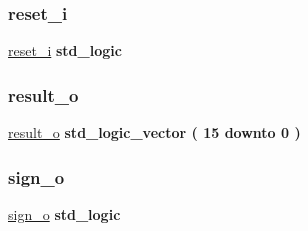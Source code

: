 \mbox{\label{classtb__alu_1_1sim_acdf401306b90eed21a930a1cdc85e912}} 
\subsubsection{\texorpdfstring{reset\+\_\+i}{reset\_i}}
{\footnotesize\ttfamily \hyperlink{classtb__alu_1_1sim_acdf401306b90eed21a930a1cdc85e912}{reset\+\_\+i} {\bfseries \textcolor{comment}{std\+\_\+logic}\textcolor{vhdlchar}{ }} \hspace{0.3cm}{\ttfamily [Signal]}}

\mbox{\label{classtb__alu_1_1sim_a9dbda0fe1ce0149ac85e0c8e3bc9d201}} 
\subsubsection{\texorpdfstring{result\+\_\+o}{result\_o}}
{\footnotesize\ttfamily \hyperlink{classtb__alu_1_1sim_a9dbda0fe1ce0149ac85e0c8e3bc9d201}{result\+\_\+o} {\bfseries \textcolor{comment}{std\+\_\+logic\+\_\+vector}\textcolor{vhdlchar}{ }\textcolor{vhdlchar}{(}\textcolor{vhdlchar}{ }\textcolor{vhdlchar}{ } \textcolor{vhdldigit}{15} \textcolor{vhdlchar}{ }\textcolor{keywordflow}{downto}\textcolor{vhdlchar}{ }\textcolor{vhdlchar}{ } \textcolor{vhdldigit}{0} \textcolor{vhdlchar}{ }\textcolor{vhdlchar}{)}\textcolor{vhdlchar}{ }} \hspace{0.3cm}{\ttfamily [Signal]}}

\mbox{\label{classtb__alu_1_1sim_af79695f4ad70e8ad8db0623ecd408492}} 
\subsubsection{\texorpdfstring{sign\+\_\+o}{sign\_o}}
{\footnotesize\ttfamily \hyperlink{classtb__alu_1_1sim_af79695f4ad70e8ad8db0623ecd408492}{sign\+\_\+o} {\bfseries \textcolor{comment}{std\+\_\+logic}\textcolor{vhdlchar}{ }} \hspace{0.3cm}{\ttfamily [Signal]}}

